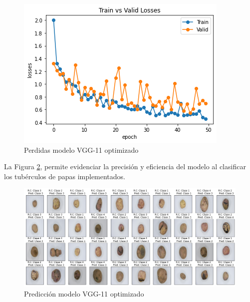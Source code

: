 \newpage
\begin{figure}[ht]
	\centering
	\includegraphics[scale=0.6]{Figs/509.png}
	\caption{Perdidas modelo VGG-11 optimizado}
	\label{fig:perdda_vgg11_opt}
\end{figure}


La Figura \ref{fig:pre_vgg11_opt}, permite evidenciar la precisión y eficiencia del modelo al clasificar los tubérculos de papas implementados. 	
\begin{figure}[ht]
	\centering
	\includegraphics[scale=0.4]{Figs/510.png}
	\caption{Predicción modelo VGG-11 optimizado}
	\label{fig:pre_vgg11_opt}
\end{figure}

